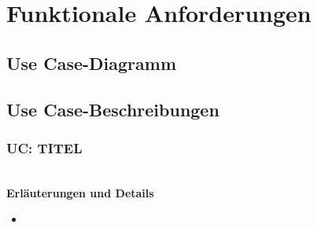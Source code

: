 \section{Funktionale Anforderungen}

	\subsection{Use Case-Diagramm}

	\pagebreak

	\subsection{Use Case-Beschreibungen}

	\subsubsection{UC: TITEL}

	
			\\[0.5cm]
			\textbf{Erläuterungen und Details}
			\begin{itemize}
				\item 
			\end{itemize}